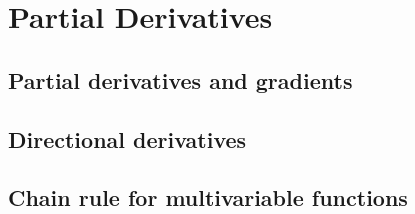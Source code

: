 
\section{Partial Derivatives}

\subsection{Partial derivatives and gradients}


\subsection{Directional derivatives}


\subsection{Chain rule for multivariable functions}

